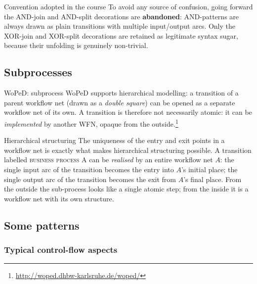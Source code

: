\begin{notebox}{Convention adopted in the course}
To avoid any source of confusion, going forward the AND-join and AND-split decorations are \textbf{abandoned}: AND-patterns are always drawn as plain transitions with multiple input/output arcs. Only the XOR-join and XOR-split decorations are retained as legitimate syntax sugar, because their unfolding is genuinely non-trivial.
\end{notebox}

\subsection{Subprocesses}

\begin{examplebox}{WoPeD: subprocess}
WoPeD supports hierarchical modelling: a transition of a parent workflow net (drawn as a \emph{double square}) can be opened as a separate workflow net of its own. A transition is therefore not necessarily atomic: it can be \emph{implemented} by another WFN, opaque from the outside.\footnote{\url{http://woped.dhbw-karlsruhe.de/woped/}}
\end{examplebox}

\begin{notebox}{Hierarchical structuring}
The uniqueness of the entry and exit points in a workflow net is exactly what makes hierarchical structuring possible. A transition labelled \textsc{business process A} can be \emph{realised} by an entire workflow net $A$: the single input arc of the transition becomes the entry into $A$'s initial place; the single output arc of the transition becomes the exit from $A$'s final place. From the outside the sub-process looks like a single atomic step; from the inside it is a workflow net with its own structure.
\end{notebox}

\subsection{Some patterns}

\subsubsection{Typical control-flow aspects}

